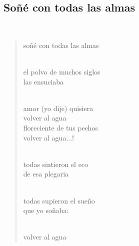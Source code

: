 \documentclass[a4paper, 12pt]{article}
\begin{document}
\pagebreak
\subsection{Soñé con todas las almas}
~ 

\begin{verse}
soñé con todas las almas\\
~

el polvo de muchos siglos\\
las ensuciaba\\
~

amor (yo dije) quisiera\\
volver al agua\\
floreciente de tus pechos\\
volver al agua...!\\
~

todas sintieron el eco\\
de esa plegaria\\
~

todas supieron el sueño\\
que yo soñaba:\\
~

volver al agua\\
\end{verse}

\pagebreak
\end{document}
